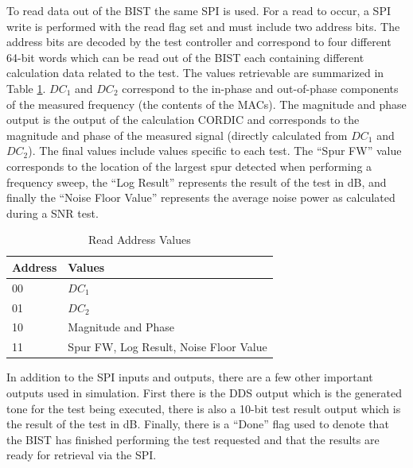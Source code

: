\documentclass[12pt]{report}
\begin{document}
To read data out of the BIST the same SPI is used.  For a read to occur, a SPI write is performed with the read flag set and must include two address bits.  The address bits are decoded by the test controller and correspond to four different 64-bit words which can be read out of the BIST each containing different calculation data related to the test.  The values retrievable are summarized in Table \ref{tbl:readvals}.  $DC_1$ and $DC_2$ correspond to the in-phase and out-of-phase components of the measured frequency (the contents of the MACs).  The magnitude and phase output is the output of the calculation CORDIC and corresponds to the magnitude and phase of the measured signal (directly calculated from $DC_1$ and $DC_2$).  The final values include values specific to each test.  The ``Spur FW'' value corresponds to the location of the largest spur detected when performing a frequency sweep, the ``Log Result'' represents the result of the test in dB, and finally the ``Noise Floor Value'' represents the average noise power as calculated during a SNR test.
\begin{table}
	\caption{Read Address Values}
	\begin{center}
		\begin{tabular}{|l|l|}
			\hline
			Address & Values \\ \hline
			00 & $DC_1$ \\ \hline
			01 & $DC_2$ \\ \hline
			10 & Magnitude and Phase \\ \hline
			11 & Spur FW, Log Result, Noise Floor Value \\ \hline			
		\end{tabular}
	\end{center}
	\label{tbl:readvals}
\end{table}

In addition to the SPI inputs and outputs, there are a few other important outputs used in simulation.  First there is the DDS output which is the generated tone for the test being executed, there is also a 10-bit test result output which is the result of the test in dB.  Finally, there is a ``Done'' flag used to denote that the BIST has finished performing the test requested and that the results are ready for retrieval via the SPI.
\end{document}
